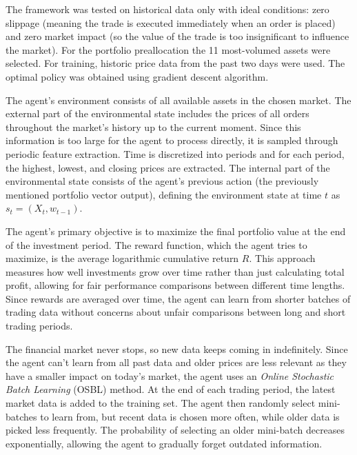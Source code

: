\documentclass[a4paper,oneside,onecolumn,12pt]{book}
\begin{document}
	The framework was tested on historical data only with ideal conditions: zero slippage (meaning the trade is executed immediately when an order is placed) and zero market impact (so the value of the trade is too insignificant to influence the market). For the portfolio preallocation the 11 most-volumed assets were selected. For training, historic price data from the past two days were used. The optimal policy was obtained using gradient descent algorithm.

	The agent's environment consists of all available assets in the chosen market. The external part of the environmental state includes the prices of all orders throughout the market's history up to the current moment. Since this information is too large for the agent to process directly, it is sampled through periodic feature extraction. Time is discretized into periods and for each period, the highest, lowest, and closing prices are extracted. The internal part of the environmental state consists of the agent's previous action (the previously mentioned portfolio vector output), defining the environment state at time $t$ as $s_t = (X_t, w_{t-1})$.

	The agent's primary objective is to maximize the final portfolio value at the end of the investment period. The reward function, which the agent tries to maximize, is the average logarithmic cumulative return $R$. This approach measures how well investments grow over time rather than just calculating total profit, allowing for fair performance comparisons between different time lengths. Since rewards are averaged over time, the agent can learn from shorter batches of trading data without concerns about unfair comparisons between long and short trading periods.

	The financial market never stops, so new data keeps coming in indefinitely. Since the agent can't learn from all past data and older prices are less relevant as they have a smaller impact on today's market, the agent uses an \textit{Online Stochastic Batch Learning} (OSBL) method. At the end of each trading period, the latest market data is added to the training set. The agent then randomly select mini-batches to learn from, but recent data is chosen more often, while older data is picked less frequently. The probability of selecting an older mini-batch decreases exponentially, allowing the agent to gradually forget outdated information.
\end{document}
